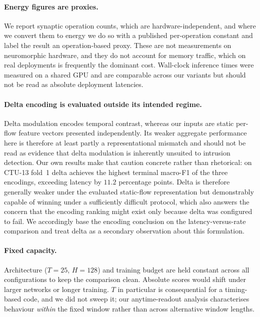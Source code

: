 \paragraph{Energy figures are proxies.}
We report synaptic operation counts, which are hardware-independent, and where
we convert them to energy we do so with a published per-operation constant and
label the result an operation-based proxy. These are not measurements on
neuromorphic hardware, and they do not account for memory traffic, which on real
deployments is frequently the dominant cost. Wall-clock inference times were
measured on a shared GPU and are comparable across our variants but should not
be read as absolute deployment latencies.

\paragraph{Delta encoding is evaluated outside its intended regime.}
Delta modulation encodes temporal contrast, whereas our inputs are static
per-flow feature vectors presented independently. Its weaker aggregate
performance here is therefore at least partly a representational mismatch and
should not be read as evidence that delta modulation is inherently unsuited to
intrusion detection. Our own results make that caution concrete rather than
rhetorical: on CTU-13 fold~1 delta achieves the highest terminal macro-F1 of the
three encodings, exceeding latency by $11.2$ percentage points. Delta is
therefore generally weaker under the evaluated static-flow representation but
demonstrably capable of winning under a sufficiently difficult protocol, which
also answers the concern that the encoding ranking might exist only because
delta was configured to fail. We accordingly base the encoding conclusion on the
latency-versus-rate comparison and treat delta as a secondary observation about
this formulation.

\paragraph{Fixed capacity.}
Architecture ($T=25$, $H=128$) and training budget are held constant across all
configurations to keep the comparison clean. Absolute scores would shift under
larger networks or longer training. $T$ in particular is consequential for a
timing-based code, and we did not sweep it; our anytime-readout analysis
characterises behaviour \emph{within} the fixed window rather than across
alternative window lengths.
